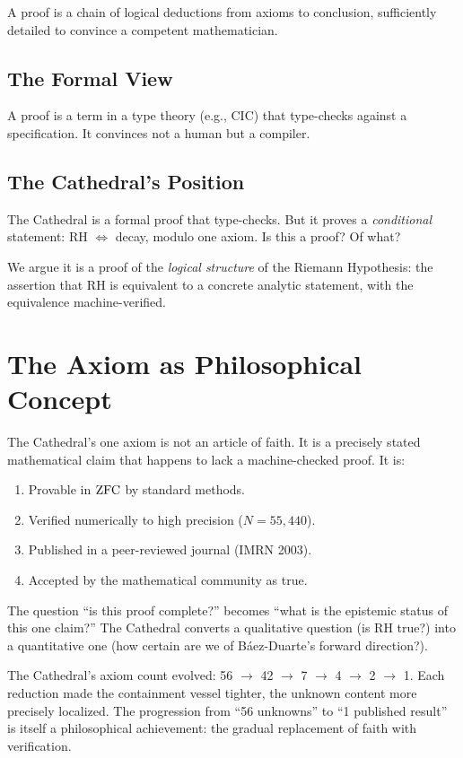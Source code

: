 \documentclass[11pt,a4paper]{article}
\begin{document}
A proof is a chain of logical deductions from axioms to conclusion,
sufficiently detailed to convince a competent mathematician.

\subsection{The Formal View}

A proof is a term in a type theory (e.g., CIC) that type-checks
against a specification. It convinces not a human but a compiler.

\subsection{The Cathedral's Position}

The Cathedral is a formal proof that type-checks. But it proves
a \emph{conditional} statement: RH $\iff$ decay, modulo one axiom.
Is this a proof? Of what?

We argue it is a proof of the \emph{logical structure} of the
Riemann Hypothesis: the assertion that RH is equivalent to a
concrete analytic statement, with the equivalence machine-verified.

\section{The Axiom as Philosophical Concept}

The Cathedral's one axiom is not an article of faith. It is a
precisely stated mathematical claim that happens to lack
a machine-checked proof. It is:
\begin{enumerate}
  \item Provable in $\mathrm{ZFC}$ by standard methods.
  \item Verified numerically to high precision ($N = 55{,}440$).
  \item Published in a peer-reviewed journal (IMRN 2003).
  \item Accepted by the mathematical community as true.
\end{enumerate}

The question ``is this proof complete?'' becomes ``what is the
epistemic status of this one claim?'' The Cathedral converts a
qualitative question (is RH true?) into a quantitative one (how
certain are we of B\'aez-Duarte's forward direction?).

\begin{remark}
The Cathedral's axiom count evolved: 56 $\to$ 42 $\to$ 7 $\to$ 4
$\to$ 2 $\to$ 1. Each reduction made the containment vessel
tighter, the unknown content more precisely localized. The
progression from ``56 unknowns'' to ``1 published result''
is itself a philosophical achievement: the gradual replacement
of faith with verification.
\end{remark}
\end{document}
